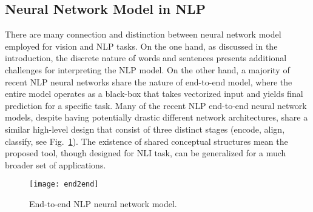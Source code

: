 

\subsection{Neural Network Model in NLP}
There are many connection and distinction between neural network model employed for vision and NLP tasks.
On the one hand, as discussed in the introduction, the discrete nature of words and sentences presents additional challenges for
interpreting the NLP model.
%
On the other hand, a majority of recent NLP neural networks share the nature of
end-to-end model, where the entire model operates as a black-box that takes
vectorized input and yields final prediction for a specific task.
%
Many of the recent NLP end-to-end neural network models, despite having potentially drastic different network architectures, share a similar high-level design that consist of three distinct stages (encode, align, classify, see Fig.~\ref{fig:modelPipeline}). 
%
The existence of shared conceptual structures mean the proposed tool, though designed for NLI task, can be generalized for a much broader set of applications.

\begin{figure}[htbp]
\centering
 \texttt{[image: end2end]}
 \vspace{-2mm}
 \caption{End-to-end NLP neural network model.}
  \vspace{-2mm}
\label{fig:modelPipeline}
\end{figure}

